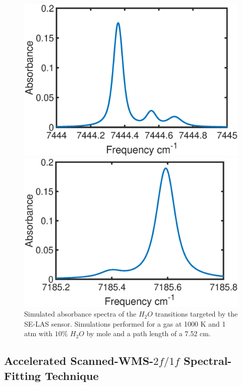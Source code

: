\begin{figure}  
\begin{minipage}[h]{0.5\linewidth}  
\centering  
\includegraphics[width=1\textwidth]{fig/ch4_fig3_1.eps}  
\end{minipage}%
\begin{minipage}[h]{0.5\linewidth}  
\centering  
\includegraphics[width=1\textwidth]{fig/ch4_fig3_2.eps}  
\end{minipage} 
\caption{Simulated absorbance spectra of the $H_2O$ transitions targeted by the SE-LAS sensor. Simulations performed for a gas at 1000 K and 1 atm with $10\%$ $H_2O$ by mole and a path length of a 7.52 cm.}
    \label{fig:ch4_1}
\end{figure} 


\subsection{Accelerated Scanned-WMS-{$2f/1f$} Spectral-Fitting Technique}

